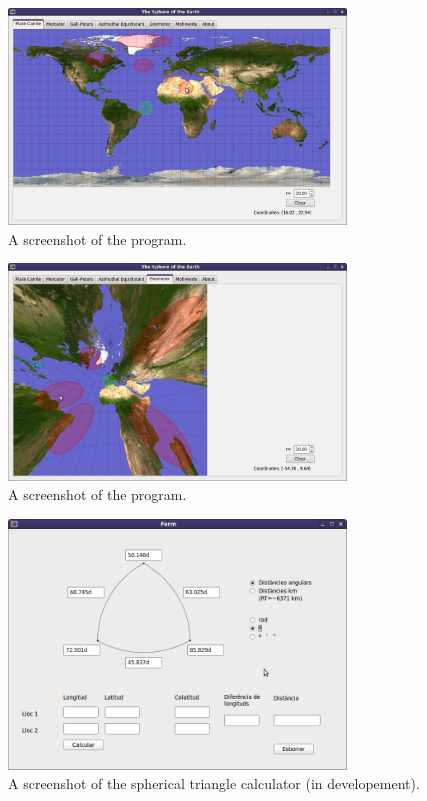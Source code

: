 \documentclass[a4paper,12pt]{article}
\begin{document}
\begin{figure}[h]
\begin{center}
\includegraphics[width=0.8\textwidth]{soe1.png}
\caption{A screenshot of the program.}
\end{center}
\end{figure}
 
 \begin{figure}[h]
\begin{center}
\includegraphics[width=0.8\textwidth]{soe2.png}
\caption{A screenshot of the program.}
\end{center}
\end{figure}

 
 \begin{figure}[h]
\begin{center}
\includegraphics[width=0.8\textwidth]{triang.png}
\caption{A screenshot of the spherical triangle calculator (in developement).}
\end{center}
\end{figure}
 
 
\end{document}
